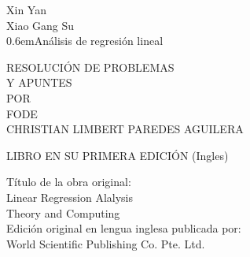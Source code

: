\begin{titlingpage}

\newcommand\nbvspace[1][3]{\vspace*{\stretch{#1}}}
\newcommand\nbstretchyspace{\spaceskip0.5em plus 0.25em minus 0.25em}
\newcommand{\nbtitlestretch}{\spaceskip0.6em}
\pagestyle{empty}

\begin{center}
\bfseries
\nbvspace[1]

\Large Xin Yan\\
\Large Xiao Gang Su\\
\Huge
{\nbtitlestretch\Huge Análisis de regresión lineal}\\
\nbvspace[1]

RESOLUCIÓN DE PROBLEMAS\\
Y APUNTES\\

\nbvspace[1]
\small POR\\
\Large FODE\\[0.5em]
\footnotesize CHRISTIAN LIMBERT PAREDES AGUILERA\\

\nbvspace[2]

\begin{center}
\end{center}

\nbvspace[3]
\normalsize

LIBRO EN SU PRIMERA EDICIÓN (Ingles)\\
\large
\nbvspace[1]

\end{center}

\break
\bfseries 

\nbvspace[1]
Título de la obra original:\\
Linear Regression Alalysis \\
Theory and Computing\\
Edición original en lengua inglesa publicada por:\\
World Scientific Publishing Co. Pte. Ltd.\\


\end{titlingpage}
